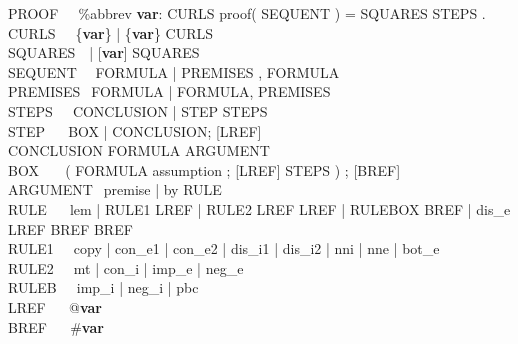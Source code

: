 \documentclass[BA.tex]{subfiles}
\begin{document}
\newcommand{\id}{{\bf var}}
\newcommand{\atom}{{\id}}
{\ttfamily
\noindent
PROOF $~~~~~$\tra \%abbrev \id: CURLS proof( SEQUENT ) =
                  SQUARES STEPS .\\
CURLS $~~~~~$\tra \{\atom\} | \{\atom\} CURLS\\
SQUARES $~~~$\tra [\atom] | [\atom] SQUARES\\
SEQUENT $~~~$\tra \txt{|-} FORMULA | PREMISES , \txt{|-} FORMULA\\
PREMISES $~~$\tra FORMULA | FORMULA, PREMISES\\
STEPS $~~~~~$\tra CONCLUSION | STEP STEPS\\
STEP $~~~~~~$\tra BOX | CONCLUSION; [LREF]\\
CONCLUSION   \tra FORMULA ARGUMENT\\
BOX $~~~~~~~$\tra ( FORMULA assumption ; [LREF] STEPS ) ; [BREF]\\
ARGUMENT $~~$\tra premise | by RULE\spc \\
RULE $~~~~~~$\tra lem | RULE1 LREF | RULE2 LREF LREF | 
                  RULEBOX BREF |
                  dis\_e LREF BREF BREF\\
RULE1 $~~~~~$\tra copy | con\_e1 | con\_e2 |
                  dis\_i1 | 
                  dis\_i2 | nni | nne | bot\_e\\
RULE2 $~~~~~$\tra mt | con\_i | imp\_e | neg\_e\\
RULEB $~~~~~$\tra imp\_i | neg\_i | pbc\\
LREF $~~~~~~$\tra @\id\\
BREF $~~~~~~$\tra \#\id
}
\end{document}
